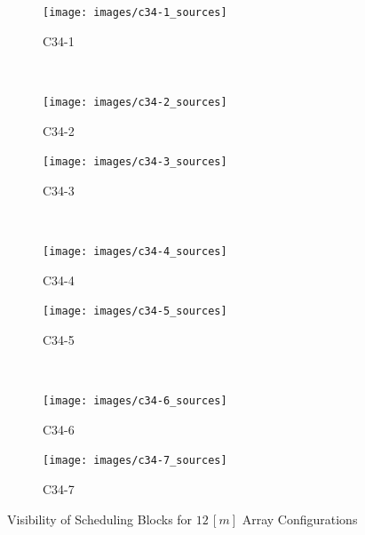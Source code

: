 \begin{figure}
        \centering
        \begin{subfigure}[b]{0.49\textwidth}
                \texttt{[image: images/c34-1\_sources]}
                \caption{C34-1} 
        \end{subfigure} 
        ~ %
%
        \begin{subfigure}[b]{0.49\textwidth}
                \texttt{[image: images/c34-2\_sources]}
                \caption{C34-2}
        \end{subfigure}

        \begin{subfigure}[b]{0.49\textwidth}
                \texttt{[image: images/c34-3\_sources]}
                \caption{C34-3}
        \end{subfigure}
        ~ 
        \begin{subfigure}[b]{0.49\textwidth}
                \texttt{[image: images/c34-4\_sources]}
                \caption{C34-4}
        \end{subfigure}%
        
        \begin{subfigure}[b]{0.49\textwidth}
                \texttt{[image: images/c34-5\_sources]}
                \caption{C34-5}
        \end{subfigure}
        ~
        \begin{subfigure}[b]{0.49\textwidth}
                \texttt{[image: images/c34-6\_sources]}
                \caption{C34-6}
        \end{subfigure}
        
        \begin{subfigure}[b]{0.49\textwidth}
                \texttt{[image: images/c34-7\_sources]}
                \caption{C34-7}
        \end{subfigure}           
          
        \caption{Visibility of Scheduling Blocks for $12\,[m]$ Array Configurations}\label{fig:results-sb-critical-set}
\end{figure}